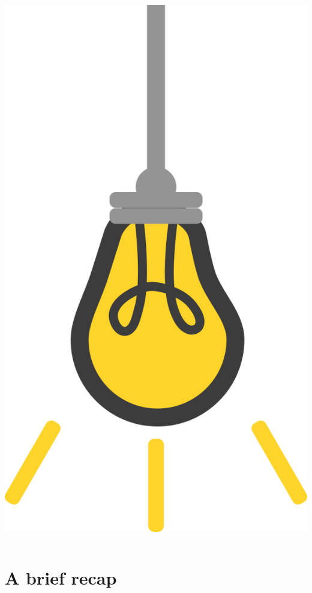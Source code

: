 \documentclass[9pt, aspectratio=169]{beamer}
\begin{document}
\begin{frame}
\begin{columns}
\begin{column}{0.2\textwidth}
            \includegraphics[angle=-30, origin=tr, width=1.5\textwidth]{lightbulb.png}
        \end{column}
    \end{columns}
\end{frame}

\section{A brief recap}
\end{document}
